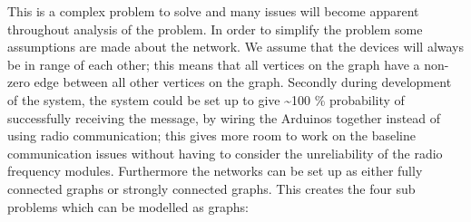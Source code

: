 \noindent This is a complex problem to solve and many issues will become apparent throughout analysis of the problem.
In order to simplify the problem some assumptions are made about the network.
We assume that the devices will always be in range of each other; this means that all vertices on the graph have a non-zero edge between all other vertices on the graph.
Secondly during development of the system, the system could be set up to give \textasciitilde100 \% probability of successfully receiving the message, by wiring the Arduinos together instead of using radio communication; this gives more room to work on the baseline communication issues without having to consider the unreliability of the radio frequency modules.
Furthermore the networks can be set up as either fully connected graphs or strongly connected graphs.
This creates the four sub problems which can be modelled as graphs:
\\
